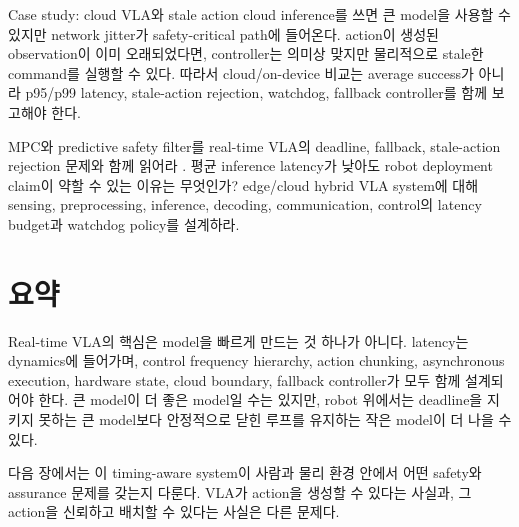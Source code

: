 \begin{casebox}{Case study: cloud VLA와 stale action}
cloud inference를 쓰면 큰 model을 사용할 수 있지만 network jitter가 safety-critical path에 들어온다. action이 생성된 observation이 이미 오래되었다면, controller는 의미상 맞지만 물리적으로 stale한 command를 실행할 수 있다. 따라서 cloud/on-device 비교는 average success가 아니라 p95/p99 latency, stale-action rejection, watchdog, fallback controller를 함께 보고해야 한다.
\end{casebox}

\chapterwork
{MPC와 predictive safety filter를 real-time VLA의 deadline, fallback, stale-action rejection 문제와 함께 읽어라 \cite{mayne2000,predictivesafetyfilter2021}.}
{평균 inference latency가 낮아도 robot deployment claim이 약할 수 있는 이유는 무엇인가?}
{edge/cloud hybrid VLA system에 대해 sensing, preprocessing, inference, decoding, communication, control의 latency budget과 watchdog policy를 설계하라.}

\section{요약}

Real-time VLA의 핵심은 model을 빠르게 만드는 것 하나가 아니다. latency는 dynamics에 들어가며, control frequency hierarchy, action chunking, asynchronous execution, hardware state, cloud boundary, fallback controller가 모두 함께 설계되어야 한다. 큰 model이 더 좋은 model일 수는 있지만, robot 위에서는 deadline을 지키지 못하는 큰 model보다 안정적으로 닫힌 루프를 유지하는 작은 model이 더 나을 수 있다.

다음 장에서는 이 timing-aware system이 사람과 물리 환경 안에서 어떤 safety와 assurance 문제를 갖는지 다룬다. VLA가 action을 생성할 수 있다는 사실과, 그 action을 신뢰하고 배치할 수 있다는 사실은 다른 문제다.
